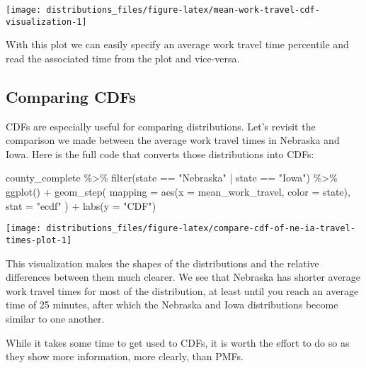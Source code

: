 \documentclass[
]{book}
\newenvironment{Shaded}{\begin{snugshade}}{\end{snugshade}}
\newcommand{\AttributeTok}[1]{\textcolor[rgb]{0.77,0.63,0.00}{#1}}
\newcommand{\FunctionTok}[1]{\textcolor[rgb]{0.00,0.00,0.00}{#1}}
\newcommand{\NormalTok}[1]{#1}
\newcommand{\SpecialCharTok}[1]{\textcolor[rgb]{0.00,0.00,0.00}{#1}}
\newcommand{\StringTok}[1]{\textcolor[rgb]{0.31,0.60,0.02}{#1}}
\begin{document}
\begin{center}\texttt{[image: distributions\_files/figure-latex/mean-work-travel-cdf-visualization-1]} \end{center}

With this plot we can easily specify an average work travel time percentile and read the associated time from the plot and vice-versa.

\hypertarget{comparing-cdfs}{%
\subsection{Comparing CDFs}\label{comparing-cdfs}}

CDFs are especially useful for comparing distributions.
Let's revisit the comparison we made between the average work travel times in Nebraska and Iowa.
Here is the full code that converts those distributions into CDFs:

\begin{Shaded}
\begin{Highlighting}[]
\NormalTok{county\_complete }\SpecialCharTok{\%\textgreater{}\%}
  \FunctionTok{filter}\NormalTok{(state }\SpecialCharTok{==} \StringTok{"Nebraska"} \SpecialCharTok{|}\NormalTok{ state }\SpecialCharTok{==} \StringTok{"Iowa"}\NormalTok{) }\SpecialCharTok{\%\textgreater{}\%}
  \FunctionTok{ggplot}\NormalTok{() }\SpecialCharTok{+}
  \FunctionTok{geom\_step}\NormalTok{(}
    \AttributeTok{mapping =} \FunctionTok{aes}\NormalTok{(}\AttributeTok{x =}\NormalTok{ mean\_work\_travel, }\AttributeTok{color =}\NormalTok{ state),}
    \AttributeTok{stat =} \StringTok{"ecdf"}
\NormalTok{  ) }\SpecialCharTok{+}
  \FunctionTok{labs}\NormalTok{(}\AttributeTok{y =} \StringTok{"CDF"}\NormalTok{)}
\end{Highlighting}
\end{Shaded}

\begin{center}\texttt{[image: distributions\_files/figure-latex/compare-cdf-of-ne-ia-travel-times-plot-1]} \end{center}

This visualization makes the shapes of the distributions and the relative differences between them much clearer.
We see that Nebraska has shorter average work travel times for most of the distribution, at least until you reach an average time of 25 minutes, after which the Nebraska and Iowa distributions become similar to one another.

While it takes some time to get used to CDFs, it is worth the effort to do so as they show more information, more clearly, than PMFs.
\end{document}
